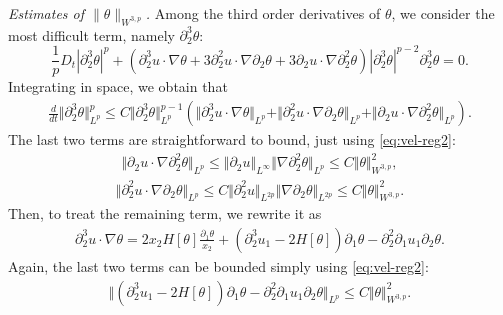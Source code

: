 \documentclass[10pt]{amsart}
\theoremstyle{definition}
\theoremstyle{remark}
\numberwithin{equation}{section}
\newcommand{\nrm}[1]{\Vert#1\Vert}
\newcommand{\rd}{\partial}
\newcommand{\0}{\emptyset}
\newcommand{\tht}{\theta}
\begin{document}
		\noindent \textit{Estimates of $\| \tht \|_{W^{3,p}}$.} Among the third order derivatives of $\tht$, we consider the most difficult term, namely $\rd_{2}^{3}\tht$: 
		\begin{equation*}
			\frac{1}{p} D_t |\rd_{2}^3 \tht|^p + (\rd_{2}^3u \cdot \nabla \tht + 3\rd_{2}^2u \cdot \nabla \rd_{2} \tht + 3\rd_{2} u \cdot \nabla \rd_{2}^2\tht)|\rd_2^3 \tht|^{p-2} \rd_{2}^3 \tht = 0.
		\end{equation*} Integrating in space, we obtain that \begin{equation*}
			\begin{split}
				\frac{d}{dt} \nrm{\rd_{2}^{3} \tht}_{L^{p}}^{p} \le C  \nrm{\rd_{2}^{3} \tht}_{L^{p}}^{p-1} \left(  \nrm{ \rd_{2}^3u \cdot \nabla \tht }_{L^p} + \nrm{\rd_{2}^2u \cdot \nabla \rd_{2} \tht}_{L^p} + \nrm{\rd_{2} u \cdot \nabla \rd_{2}^2\tht }_{L^p} \right). 
			\end{split}
		\end{equation*} The last two terms are straightforward to bound, just using \eqref{eq:vel-reg2}: \begin{equation*}
			\begin{split}
				\nrm{\rd_{2} u \cdot \nabla \rd_{2}^2\tht }_{L^p} \le \nrm{\rd_{2} u }_{L^\infty} \nrm{\nabla \rd_{2}^2\tht }_{L^p} \le C\nrm{\tht}_{W^{3,p}}^{2}, 
			\end{split}
		\end{equation*}\begin{equation*}
			\begin{split}
				\nrm{\rd_{2}^2u \cdot \nabla \rd_{2} \tht}_{L^p} \le C\nrm{\rd_{2}^2u }_{L^{2p}} \nrm{\nabla \rd_{2} \tht}_{L^{2p}} \le C\nrm{\tht}_{W^{3,p}}^{2}. 
			\end{split}
		\end{equation*} Then, to treat the remaining term, we rewrite it as \begin{equation*}
			\begin{split}
				\rd_{2}^3u \cdot \nabla \tht = 2x_{2}H[\tht] \frac{\rd_{1}\tht}{x_{2}} +  (\rd_{2}^3u_1 - 2H[\tht]) \rd_{1}\tht -  \rd_{2}^{2}\rd_{1}u_{1} \rd_{2}\tht. 
			\end{split}
		\end{equation*} Again, the last two terms can be bounded simply using \eqref{eq:vel-reg2}: \begin{equation*}
			\begin{split}
				\nrm{ (\rd_{2}^3u_1 - 2H[\tht]) \rd_{1}\tht -  \rd_{2}^{2}\rd_{1}u_{1} \rd_{2}\tht}_{L^{p}} \le  C\nrm{\tht}_{W^{3,p}}^{2}. 
			\end{split}

\end{equation*}
\end{document}
